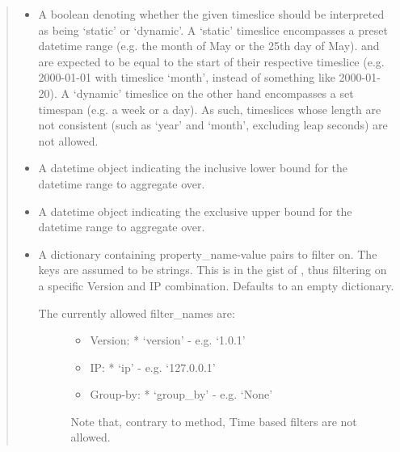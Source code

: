 \documentclass[letterpaper,10pt,english]{sphinxmanual}
\begin{document}
\begin{fulllineitems}
\begin{fulllineitems}
\begin{quote}
\begin{description}
\begin{itemize}
\item {} 
 \textendash{} A boolean denoting whether the given timeslice should be interpreted as being ‘static’ or ‘dynamic’.
A ‘static’ timeslice encompasses a preset datetime range (e.g. the month of May or the 25th day of May).
 and  are expected to be equal to the start of their respective timeslice
(e.g. 2000-01-01 with timeslice ‘month’, instead of something like 2000-01-20).
A ‘dynamic’ timeslice on the other hand encompasses a set timespan (e.g. a week or a day).
As such, timeslices whose length are not consistent (such as ‘year’ and ‘month’, excluding leap seconds) are not allowed.

\item {} 
 \textendash{} A datetime object indicating the inclusive lower bound for the datetime range to
aggregate over.

\item {} 
 \textendash{} A datetime object indicating the exclusive upper bound for the datetime range to
aggregate over.

\item {} 
 \textendash{} 
A dictionary containing property\_name-value pairs to filter on. The keys are assumed to be strings.
This is in the gist of , thus filtering on a specific Version and IP combination.
Defaults to an empty dictionary.
\begin{description}
\item[{The currently allowed filter\_names are:}] \leavevmode\begin{itemize}
\item {} 
Version:
* ‘version’ - e.g. ‘1.0.1’

\item {} 
IP:
* ‘ip’ - e.g. ‘127.0.0.1’

\item {} 
Group-by:
* ‘group\_by’ - e.g. ‘None’

\end{itemize}

Note that, contrary to  method, Time based filters are not allowed.

\end{description}



\end{itemize}
\end{description}
\end{quote}
\end{fulllineitems}
\end{fulllineitems}
\end{document}
